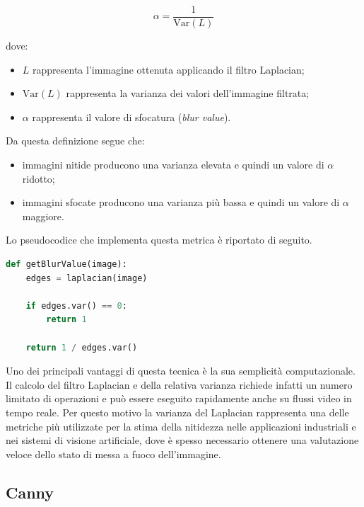 \documentclass[
    target=bach,
    aauheader=,
    style=
]{thud}
\begin{document}
\begin{equation}
\alpha = \frac{1}{\mathrm{Var}(L)}
\end{equation}

dove:

\begin{itemize}
    \item $L$ rappresenta l'immagine ottenuta applicando il filtro Laplacian;
    \item $\mathrm{Var}(L)$ rappresenta la varianza dei valori dell'immagine filtrata;
    \item $\alpha$ rappresenta il valore di sfocatura (\textit{blur value}).
\end{itemize}

Da questa definizione segue che:

\begin{itemize}
    \item immagini nitide producono una varianza elevata e quindi un valore di $\alpha$ ridotto;
    \item immagini sfocate producono una varianza più bassa e quindi un valore di $\alpha$ maggiore.
\end{itemize}

Lo pseudocodice che implementa questa metrica è riportato di seguito.

\begin{lstlisting}[language=python]
def getBlurValue(image):
    edges = laplacian(image)

    if edges.var() == 0:
        return 1

    return 1 / edges.var()
\end{lstlisting}

Uno dei principali vantaggi di questa tecnica è la sua semplicità computazionale. Il calcolo del filtro Laplacian e della relativa varianza richiede infatti un numero limitato di operazioni e può essere eseguito rapidamente anche su flussi video in tempo reale. Per questo motivo la varianza del Laplacian rappresenta una delle metriche più utilizzate per la stima della nitidezza nelle applicazioni industriali e nei sistemi di visione artificiale, dove è spesso necessario ottenere una valutazione veloce dello stato di messa a fuoco dell'immagine.

\subsection{Canny}
\end{document}
